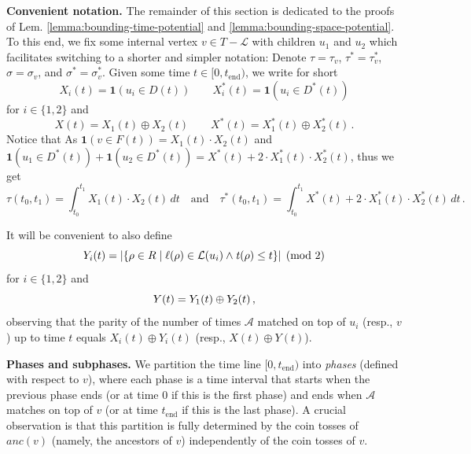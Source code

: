 \documentclass[11pt]{article}
\def\LongVersion{}
\def\LongVersionEnd{}
\def\ShortVersion{}
\def\ShortVersionEnd{}
\renewcommand{\paragraph}[1]{\par\noindent\textbf{#1}}
\theoremstyle{definition}
\theoremstyle{plain}
\theoremstyle{definition}
\theoremstyle{plain}
\theoremstyle{definition}
\theoremstyle{plain}
\newenvironment{MathMaybe}[0]
{\begin{displaymath}\ignorespaces}
{\end{displaymath}\ignorespacesafterend}
\newenvironment{MathMaybe}[0]
{\begin{math}\ignorespaces}
{\end{math}}
\newcommand{\NotationLabel}[1]{\label{notationTable:#1}\ignorespaces}
\newcommand{\Lem}{Lem.}
\newcommand{\Location}{\ell}
\newcommand{\aTime}{\mathit{t}}
\newcommand{\Leaves}{\mathcal{L}}
\newcommand{\Ancestors}{\mathit{anc}}
\newcommand{\Indicator}{\mathbf{1}}
\newcommand{\EndTime}{\mathit{t}_{\mathrm{end}}}
\newcommand{\Odd}{\mathit{D}}
\newcommand{\Effective}{\mathit{F}}
\newcommand{\A}{\mathcal{A}}
\newcommand{\adv}[1]{{#1}^{*}}
\newcommand*{\xor}{\mathbin{\oplus}}
\begin{document}
\paragraph{Convenient notation.}
The remainder of this section is dedicated to the proofs of \Lem{}
\ref{lemma:bounding-time-potential} and \ref{lemma:bounding-space-potential}.
To this end, we fix some internal vertex $v \in T - \Leaves$ with children
$u_{1}$ and $u_{2}$ which facilitates switching to a shorter and simpler
notation:
Denote
$\tau = \tau_{v}$,
$\adv{\tau} = \adv{\tau}_{v}$,
$\sigma = \sigma_{v}$, and
$\adv{\sigma} = \adv{\sigma}_{v}$.
Given some time $t \in [0, \EndTime)$, we write for short
\[
X_{i}(t) = \Indicator(u_{i} \in \Odd(t))
\qquad
\adv{X}_{i}(t) = \Indicator(u_{i} \in \adv{\Odd}(t))
\]
\NotationLabel{analysis:variable-X-i}
\NotationLabel{analysis:variable-adv-X-i}
for $i \in \{ 1, 2 \}$ and
\[
X(t) = X_{1}(t) \xor X_{2}(t)
\qquad
\adv{X}(t) = \adv{X}_{1}(t) \xor \adv{X}_{2}(t) \, .
\]
\NotationLabel{analysis:variable-X}
\NotationLabel{analysis:variable-adv-X}
\LongVersion %
Notice that
\LongVersionEnd %
%
\ShortVersion %
As
\ShortVersionEnd %
$\Indicator(v \in \Effective(t))
=
X_{1}(t) \cdot X_{2}(t)$
and
$\Indicator(u_{1} \in \adv{\Odd}(t)) + \Indicator(u_{2} \in \adv{\Odd}(t))
=
\adv{X}(t) + 2 \cdot \adv{X}_{1}(t) \cdot \adv{X}_{2}(t)$,
\LongVersion %
thus
\LongVersionEnd %
%
\ShortVersion %
we get
\ShortVersionEnd %
\[
\tau(t_{0}, t_{1})
=
\int_{t_{0}}^{t_{1}} X_{1}(t) \cdot X_{2}(t) \, d t 
\quad \text{and} \quad
\adv{\tau}(t_{0}, t_{1})
=
\int_{t_{0}}^{t_{1}} \adv{X}(t) + 2 \cdot \adv{X}_{1}(t) \cdot \adv{X}_{2}(t) \,
d t \, .
\]

It will be convenient to also define
\begin{MathMaybe}
Y_{i}(t)
=
|\{ \rho \in R \mid \Location(\rho) \in \Leaves(u_{i}) \land
\aTime(\rho) \leq t \}| \pmod{2}
\end{MathMaybe}
\NotationLabel{analysis:variable-Y-i}
for $i \in \{ 1, 2 \}$ and
\begin{MathMaybe}
Y(t) = Y_{1}(t) \xor Y_{2}(t) \, ,
\end{MathMaybe}
\NotationLabel{analysis:variable-Y}
observing that the parity of the number of times $\A$
matched on top of $u_{i}$ (resp., $v$) up to time $t$ equals
$X_{i}(t) \xor Y_{i}(t)$
(resp.,
$X(t) \xor Y(t)$).

\paragraph{Phases and subphases.}
We partition the time line
$[0, \EndTime)$
into \emph{phases} (defined with respect to $v$),
where each phase is a time interval that starts when the previous phase
ends (or at time $0$ if this is the first phase) and ends when $\A$ matches on
top of $v$ (or at time $\EndTime$ if this is the last phase).
A crucial observation is that this partition is fully determined by the coin
tosses of $\Ancestors(v)$ (namely, the ancestors of $v$) independently of the
coin tosses of $v$.
\end{document}
